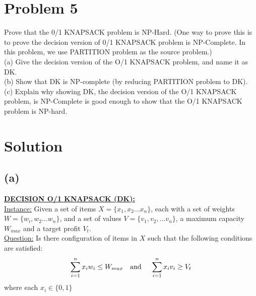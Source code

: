 
\section*{Problem 5}
	Prove that the 0/1 KNAPSACK problem is NP-Hard. 
	(One way to prove this is to prove the decision version of 0/1 KNAPSACK problem is NP-Complete.
	In this problem, we use PARTITION problem as the source problem.)\\
	
	\noindent
	(a) Give the decision version of the O/1 KNAPSACK problem, and name it as DK.\\
	(b) Show that DK is NP-complete (by reducing PARTITION problem to DK).\\
	(c) Explain why showing DK, the decision version of the O/1 KNAPSACK problem, is
	NP-Complete is good enough to show that the O/1 KNAPSACK problem is NP-hard.
\vspace{-0.25cm}
\section*{Solution}
	\subsection*{(a)}
		\underline{\textbf{DECISION O/1 KNAPSACK (DK):}}\\
		
		\noindent
		\underline{Instance:} Given a set of items $X=\{x_1, x_2 \dots x_n\}$, each with a set of weights $W = \{w_i, w_2 \dots w_n\}$, and a set of values $V = \{v_1, v_2, \dots v_n\}$, a maximum capacity $W_{max}$ and a target profit $V_t$.\\
		
		\noindent
		\underline{Question:} Is there configuration of items in $X$ such that the following conditions are satisfied:
		\begin{equation*}
				\sum_{i=1}^{n} x_i w_i \leq W_{max} \text{\quad and \quad} \sum_{i=1}^{n} x_i v_i \geq V_t
		\end{equation*}
		where each $x_i \in\{0,1\}$
